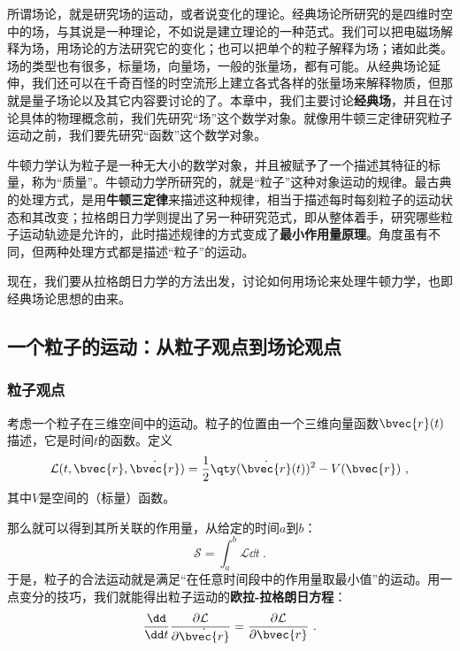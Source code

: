 





所谓场论，就是研究场的运动，或者说变化的理论。经典场论所研究的是四维时空中的场，与其说是一种理论，不如说是建立理论的一种范式。我们可以把电磁场解释为场，用场论的方法研究它的变化；也可以把单个的粒子解释为场；诸如此类。场的类型也有很多，标量场，向量场，一般的张量场，都有可能。从经典场论延伸，我们还可以在千奇百怪的时空流形上建立各式各样的张量场来解释物质，但那就是量子场论以及其它内容要讨论的了。本章中，我们主要讨论\textbf{经典场}，并且在讨论具体的物理概念前，我们先研究“场”这个数学对象。就像用牛顿三定律研究粒子运动之前，我们要先研究“函数”这个数学对象。

牛顿力学认为粒子是一种无大小的数学对象，并且被赋予了一个描述其特征的标量，称为“质量”。牛顿动力学所研究的，就是“粒子”这种对象运动的规律。最古典的处理方式，是用\textbf{牛顿三定律}来描述这种规律，相当于描述每时每刻粒子的运动状态和其改变；拉格朗日力学则提出了另一种研究范式，即从整体着手，研究哪些粒子运动轨迹是允许的，此时描述规律的方式变成了\textbf{最小作用量原理}。角度虽有不同，但两种处理方式都是描述“粒子”的运动。

现在，我们要从拉格朗日力学的方法出发，讨论如何用场论来处理牛顿力学，也即经典场论思想的由来。


\subsection{一个粒子的运动：从粒子观点到场论观点}

\subsubsection{粒子观点}

考虑一个粒子在三维空间中的运动。粒子的位置由一个三维向量函数$\bvec{r}(t)$描述，它是时间$t$的函数。定义
\begin{equation}
\mathcal{L}(t, \bvec{r},\dot{\bvec{r}}) =\frac{1}{2}\qty(\dot{\bvec{r}}(t))^2-V(\bvec{r})~,
\end{equation}
其中$V$是空间的（标量）函数。

那么就可以得到其所关联的作用量，从给定的时间$a$到$b$：
\begin{equation}
\mathcal{S}=\int ^b_a \mathcal{L} \dd t~.
\end{equation}
于是，粒子的合法运动就是满足“在任意时间段中的作用量取最小值”的运动。用一点变分的技巧，我们就能得出粒子运动的\textbf{欧拉-拉格朗日方程}：
\begin{equation}\label{eq_CFa1_1}
\frac{\dd}{\dd t}\frac{\partial\mathcal{L}}{\partial \dot{\bvec{r}}} = \frac{\partial\mathcal{L}}{\partial \bvec{r}}~.
\end{equation}


